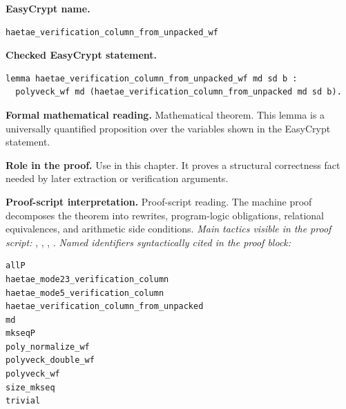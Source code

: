 \begin{formaltheorem}
\noindent\textbf{EasyCrypt name.}
\begin{lstlisting}[language=EasyCrypt,basicstyle=\ttfamily\scriptsize]
haetae_verification_column_from_unpacked_wf
\end{lstlisting}
\noindent\textbf{Checked EasyCrypt statement.}
\begin{lstlisting}[language=EasyCrypt,basicstyle=\ttfamily\scriptsize]
lemma haetae_verification_column_from_unpacked_wf md sd b :
  polyveck_wf md (haetae_verification_column_from_unpacked md sd b).
\end{lstlisting}
\noindent\textbf{Formal mathematical reading.}
Mathematical theorem. This lemma is a universally quantified proposition over the variables shown in the EasyCrypt statement.

\noindent\textbf{Role in the proof.}
Use in this chapter. It proves a structural correctness fact needed by later extraction or verification arguments.

\noindent\textbf{Proof-script interpretation.}
Proof-script reading. The machine proof decomposes the theorem into rewrites, program-logic obligations, relational equivalences, and arithmetic side conditions.
\emph{Main tactics visible in the proof script:} , , , .
\emph{Named identifiers syntactically cited in the proof block:}
\begin{lstlisting}[language=EasyCrypt,basicstyle=\ttfamily\scriptsize]
allP
haetae_mode23_verification_column
haetae_mode5_verification_column
haetae_verification_column_from_unpacked
md
mkseqP
poly_normalize_wf
polyveck_double_wf
polyveck_wf
size_mkseq
trivial
\end{lstlisting}

\end{formaltheorem}

